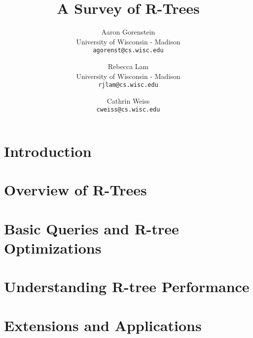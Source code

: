 \documentclass[10pt, twocolumn]{article}
\title{A Survey of R-Trees}
\author{
	Aaron Gorenstein\\
	University of Wisconsin - Madison\\
	\texttt{agorenst@cs.wisc.edu}
	\and
	Rebecca Lam\\
	University of Wisconsin - Madison\\
	\texttt{rjlam@cs.wisc.edu}
	\and
	Cathrin Weiss\\
	\texttt{cweiss@cs.wisc.edu}
}
\begin{document}
\newcommand{\rbase}{R}
\newcommand{\rstar}{$\text{R}^*$}
\newcommand{\rplus}{$\text{R}^+$}

\maketitle
\thispagestyle{empty}



\section{Introduction}
\label{sec:intro}


\section{Overview of R-Trees}
\label{sec:overview}


\section{Basic Queries and R-tree Optimizations}
\label{sec:impchal}


\section{Understanding R-tree Performance}
\label{sec:dbchal}


\section{Extensions and Applications}
\label{sec:apps}


%



\end{document}
